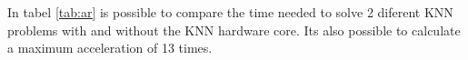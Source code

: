 \label{sec:ar}

In tabel \ref{tab:ar} is possible to compare the time needed to solve 2 diferent KNN problems with and without the KNN hardware core. Its also possible to calculate a maximum acceleration of 13 times.

\begin{table}[H]
  \centering
  \caption{Accelereration results}
  \label{tab:ar}
\end{table}
